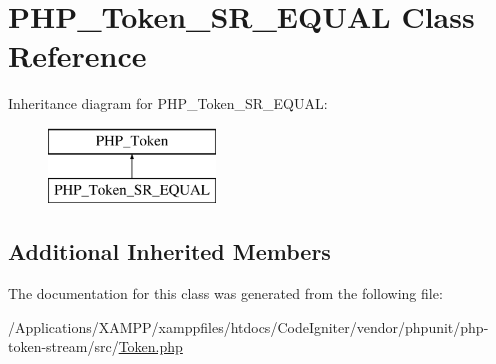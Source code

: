 \hypertarget{class_p_h_p___token___s_r___e_q_u_a_l}{}\section{P\+H\+P\+\_\+\+Token\+\_\+\+S\+R\+\_\+\+E\+Q\+U\+AL Class Reference}
\label{class_p_h_p___token___s_r___e_q_u_a_l}
Inheritance diagram for P\+H\+P\+\_\+\+Token\+\_\+\+S\+R\+\_\+\+E\+Q\+U\+AL\+:\begin{figure}[H]
\begin{center}
\leavevmode
\includegraphics[height=2.000000cm]{class_p_h_p___token___s_r___e_q_u_a_l}
\end{center}
\end{figure}
\subsection*{Additional Inherited Members}


The documentation for this class was generated from the following file\+:\begin{DoxyCompactItemize}
\item 
/\+Applications/\+X\+A\+M\+P\+P/xamppfiles/htdocs/\+Code\+Igniter/vendor/phpunit/php-\/token-\/stream/src/\mbox{\hyperlink{_token_8php}{Token.\+php}}\end{DoxyCompactItemize}
